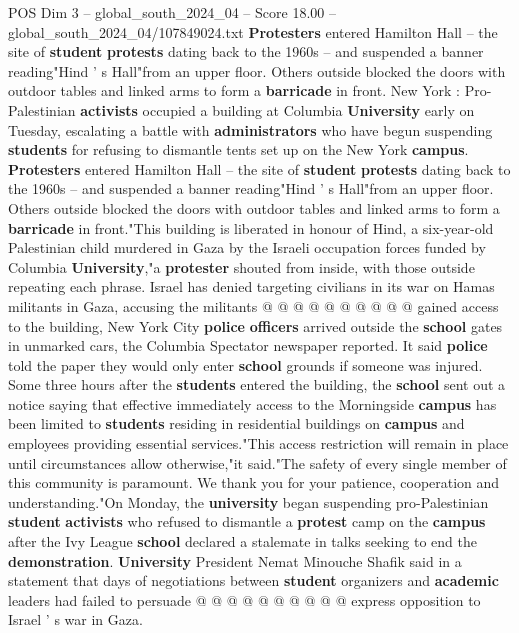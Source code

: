 \begin{textsample}{POS Dim 3 – global\_south\_2024\_04 – Score 18.00 – global\_south\_2024\_04/107849024.txt}  \label{ex:f3_pos_193}
\textbf{Protesters} entered Hamilton Hall -- the site of \textbf{student} \textbf{protests} dating back to the 1960s -- and suspended a banner reading"Hind ' s Hall"from an upper floor.
Others outside blocked the doors with outdoor tables and linked arms to form a \textbf{barricade} in front.
New York : Pro-Palestinian \textbf{activists} occupied a building at Columbia \textbf{University} early on Tuesday, escalating a battle with \textbf{administrators} who have begun suspending \textbf{students} for refusing to dismantle tents set up on the New York \textbf{campus}. \textbf{Protesters} entered Hamilton Hall -- the site of \textbf{student} \textbf{protests} dating back to the 1960s -- and suspended a banner reading"Hind ' s Hall"from an upper floor.
Others outside blocked the doors with outdoor tables and linked arms to form a \textbf{barricade} in front."This building is liberated in honour of Hind, a six-year-old Palestinian child murdered in Gaza by the Israeli occupation forces funded by Columbia \textbf{University},"a \textbf{protester} shouted from inside, with those outside repeating each phrase.
Israel has denied targeting civilians in its war on Hamas militants in Gaza, accusing the militants @ @ @ @ @ @ @ @ @ @ gained access to the building, New York City \textbf{police} \textbf{officers} arrived outside the \textbf{school} gates in unmarked cars, the Columbia Spectator newspaper reported.
It said \textbf{police} told the paper they would only enter \textbf{school} grounds if someone was injured.
Some three hours after the \textbf{students} entered the building, the \textbf{school} sent out a notice saying that effective immediately access to the Morningside \textbf{campus} has been limited to \textbf{students} residing in residential buildings on \textbf{campus} and employees providing essential services."This access restriction will remain in place until circumstances allow otherwise,"it said."The safety of every single member of this community is paramount.
We thank you for your patience, cooperation and understanding."On Monday, the \textbf{university} began suspending pro-Palestinian \textbf{student} \textbf{activists} who refused to dismantle a \textbf{protest} camp on the \textbf{campus} after the Ivy League \textbf{school} declared a stalemate in talks seeking to end the \textbf{demonstration}. \textbf{University} President Nemat Minouche Shafik said in a statement that days of negotiations between \textbf{student} organizers and \textbf{academic} leaders had failed to persuade @ @ @ @ @ @ @ @ @ @ express opposition to Israel ' s war in Gaza.

\end{textsample}
